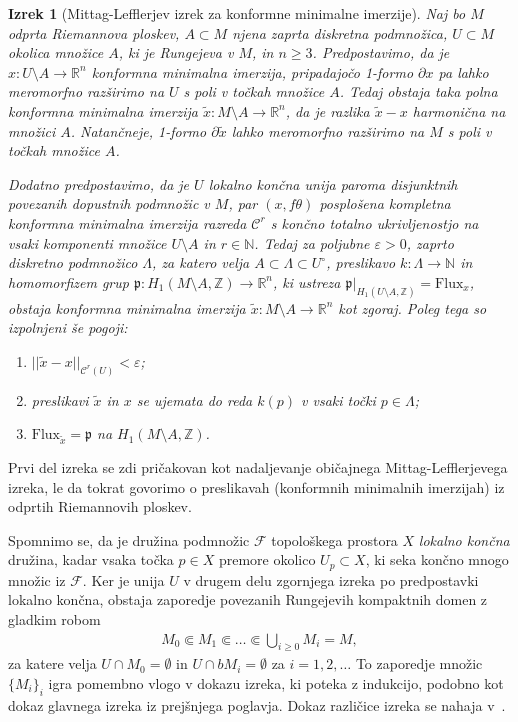 \documentclass[12pt,a4paper,twoside]{article}
\theoremstyle{definition} %
\theoremstyle{plain} %
\newtheorem{izrek}[definicija]{Izrek}
\numberwithin{equation}{section}  %
\newcommand{\R}{\mathbb R}
\newcommand{\N}{\mathbb N}
\newcommand{\Z}{\mathbb Z}
\begin{document}
\begin{izrek} [Mittag-Lefflerjev izrek za konformne minimalne imerzije] \label{izr:ML-CMI}
Naj bo $M$ odprta Riemannova ploskev, $A \subset M$ njena zaprta diskretna podmnožica, $U \subset M$ okolica množice $A$, ki je Rungejeva v $M$, in $n \geq 3$.
Predpostavimo, da je $x \colon U \setminus A \to \R^{n}$ konformna minimalna imerzija, pripadajočo 1-formo $\partial x$ pa lahko meromorfno razširimo na $U$ s poli v točkah množice $A$.
Tedaj obstaja taka polna konformna minimalna imerzija $\tilde{x} \colon M \setminus A \to \R^{n}$, da je razlika $\tilde{x}-x$ harmonična na množici $A$.
Natančneje, 1-formo $\partial \tilde{x}$ lahko meromorfno razširimo na $M$ s poli v točkah množice $A$.

Dodatno predpostavimo, da je $U$ lokalno končna unija paroma disjunktnih povezanih dopustnih podmnožic v $M$, par $(x, f\theta)$ posplošena kompletna konformna minimalna imerzija razreda $\mathcal{C}^{r}$ s končno totalno ukrivljenostjo na vsaki komponenti množice $U \setminus A$ in $r \in \N$.
Tedaj za poljubne $\varepsilon > 0$, zaprto diskretno podmnožico $\Lambda$, za katero velja $A \subset \Lambda \subset U^{\circ}$, preslikavo $k \colon \Lambda \to \N$ in homomorfizem grup $\mathfrak{p} \colon H_{1}(M \setminus A, \Z) \to \R^{n}$, ki ustreza $\mathfrak{p}|_{H_{1}(U \setminus A, \Z)} = \text{Flux}_{x}$, obstaja konformna minimalna imerzija $\tilde{x} \colon M \setminus A \to \R^{n}$ kot zgoraj. Poleg tega so izpolnjeni še pogoji:
\begin{enumerate}
\item $||\tilde{x}-x||_{\mathcal{C}^{r}(U)} < \varepsilon$;
\item preslikavi $\tilde{x}$ in $x$ se ujemata do reda $k(p)$ v vsaki točki $p \in \Lambda$;
\item $\text{Flux}_{\tilde{x}} = \mathfrak{p}$ na $H_{1}(M \setminus A, \Z)$.
\end{enumerate}
\end{izrek}

Prvi del izreka se zdi pričakovan kot nadaljevanje običajnega Mittag-Lefflerjevega izreka, le da tokrat govorimo o preslikavah (konformnih minimalnih imerzijah) iz odprtih Riemannovih ploskev.

Spomnimo se, da je družina podmnožic $\mathcal{F}$ topološkega prostora $X$ \emph{lokalno končna} družina, kadar vsaka točka $p \in X$ premore okolico $U_{p} \subset X$, ki seka končno mnogo množic iz $\mathcal{F}$.
Ker je unija $U$ v drugem delu zgornjega izreka po predpostavki lokalno končna, obstaja zaporedje povezanih Rungejevih kompaktnih domen z gladkim robom
\begin{gather*}
M_{0} \Subset M_{1} \Subset \dots \Subset \bigcup_{i \geq 0} M_{i}=M,
\end{gather*}
za katere velja $U \cap M_{0} = \emptyset$ in $U \cap bM_{i} = \emptyset$ za $i = 1,2,\dots$ To zaporedje množic $\{ M_{i} \}_{i}$ igra pomembno vlogo v dokazu izreka, ki poteka z indukcijo, podobno kot dokaz glavnega izreka iz prejšnjega poglavja.
Dokaz različice izreka se nahaja v~\cite[Theorem~7.1]{alarcon2019algebraic}. %
\end{document}
